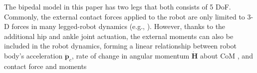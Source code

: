 The bipedal model in this paper has two legs that both consists of 5 DoF. Commonly, the external contact forces applied to the robot are only limited to 3-D forces in many legged-robot dynamics (e.g., \cite{levineblackbird,nguyen2019optimized}). However, thanks to the additional hip and ankle joint actuation, the external moments can also be included in the robot dynamics, forming a linear relationship between robot body’s acceleration $ {\bm {\ddot p}_c}$, rate of change in angular momentum $\bm {\dot H}$ about CoM \cite{stephens2010push}, and contact force and moments %

